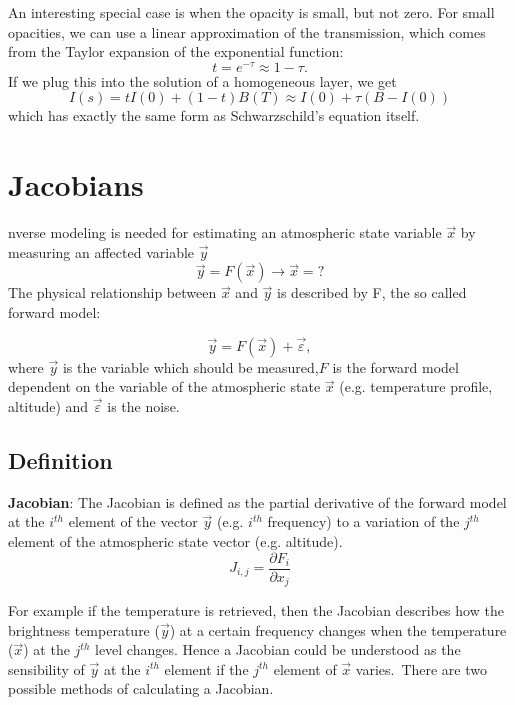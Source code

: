 \documentclass[a4paper,fleqn]{article}
\renewcommand{\epsilon}{\varepsilon}  %
\begin{document}
An interesting special case is when the opacity is small, but not zero. For small opacities, 
we can use a linear approximation of the transmission, which comes from the Taylor expansion
of the exponential function:
\begin{equation}
	t = e^{-\tau} \approx 1 - \tau.
\end{equation}
If we plug this into the solution of a homogeneous layer, we get
\begin{equation}
	I(s) = t I(0)  + \left( 1-t \right) B(T) \approx I(0) + \tau \left( B - I(0)\right)
\end{equation}
which has exactly the same form as Schwarzschild's equation itself.

\section{Jacobians}
 nverse modeling is needed for estimating an atmospheric state variable
$\vec{x}$ by measuring an affected variable $\vec{y}$
\begin{equation*}
\vec{y}=F(\vec{x}) \rightarrow \vec{x}=?
\end{equation*}
The physical relationship between $\vec{x}$ and $\vec{y}$ is described by F, the
so called forward model:

\begin{equation*}
\vec{y}=F(\vec{x})+\vec{\epsilon},
\end{equation*}
where $\vec{y}$ is the variable which should be measured,$F$ is the forward
model dependent on the variable of the atmospheric state $\vec{x}$ (e.g.
temperature profile, altitude)  and $\vec{\epsilon}$ is the noise.\\

\subsection*{Definition}
\textbf{Jacobian}:
The Jacobian is defined as the partial derivative of the forward model at the
$i^{th}$ element of the vector $\vec{y}$ (e.g. $i^{th}$ frequency) to a
variation of the $j^{th}$ element of the atmospheric state vector (e.g.
altitude).
\begin{equation*}
J_{i,j}=\frac{\partial F_i}{\partial x_j}
\end{equation*}

For example if the temperature is retrieved, then the Jacobian describes how
the brightness temperature ($\vec{y}$) at a certain frequency changes when the
temperature ($\vec{x}$) at the $j^{th}$ level changes.
Hence a Jacobian could be understood as the sensibility of $\vec{y}$ at the
$i^{th}$ element if the $j^{th}$ element of $\vec{x}$ varies.\
There are two possible methods of calculating a Jacobian.
\end{document}
